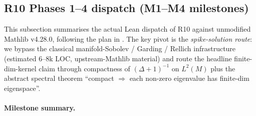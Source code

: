 \subsection{R10 Phases 1--4 dispatch (M1--M4 milestones)}
\label{subsec:r10-phase-dispatch}

This subsection summarises the actual Lean dispatch of R10 against
unmodified Mathlib v4.28.0, following the plan in
.
The key pivot is the \emph{spike-solution route}: we bypass the
classical manifold-Sobolev / Garding / Rellich infrastructure
(estimated 6--8k LOC, upstream-Mathlib material) and
route the headline finite-dim-kernel claim through compactness of
$(\Delta+1)^{-1}$ on $L^2(M)$ plus the abstract spectral theorem
``compact $\Rightarrow$ each non-zero eigenvalue has finite-dim
eigenspace''.

\paragraph{Milestone summary.}

